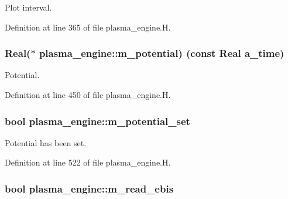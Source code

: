 Plot interval. 



Definition at line 365 of file plasma\+\_\+engine.\+H.

\subsubsection[{\texorpdfstring{m\+\_\+potential}{m_potential}}]{\setlength{\rightskip}{0pt plus 5cm}Real($\ast$ plasma\+\_\+engine\+::m\+\_\+potential) (const Real a\+\_\+time)\hspace{0.3cm}{\ttfamily [protected]}}\hypertarget{classplasma__engine_ae28be73a1922c65e933ef0b616444991}{}\label{classplasma__engine_ae28be73a1922c65e933ef0b616444991}


Potential. 



Definition at line 450 of file plasma\+\_\+engine.\+H.

\subsubsection[{\texorpdfstring{m\+\_\+potential\+\_\+set}{m_potential_set}}]{\setlength{\rightskip}{0pt plus 5cm}bool plasma\+\_\+engine\+::m\+\_\+potential\+\_\+set\hspace{0.3cm}{\ttfamily [protected]}}\hypertarget{classplasma__engine_ae8e57104b6f7135420f594840d6ec371}{}\label{classplasma__engine_ae8e57104b6f7135420f594840d6ec371}


Potential has been set. 



Definition at line 522 of file plasma\+\_\+engine.\+H.

\subsubsection[{\texorpdfstring{m\+\_\+read\+\_\+ebis}{m_read_ebis}}]{\setlength{\rightskip}{0pt plus 5cm}bool plasma\+\_\+engine\+::m\+\_\+read\+\_\+ebis\hspace{0.3cm}{\ttfamily [protected]}}\hypertarget{classplasma__engine_a4b1d92e7235153f99ca04250c83bdf91}{}\label{classplasma__engine_a4b1d92e7235153f99ca04250c83bdf91}


